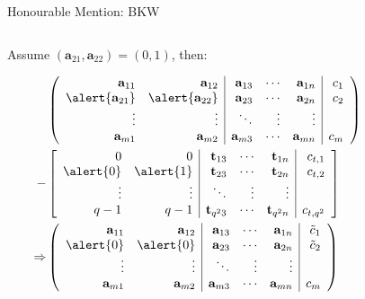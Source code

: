 \documentclass[presentation,smaller]{beamer}
\renewcommand{\vec}[1]{\mathbf{#1}\xspace}
\begin{document}
\begin{frame}[label={sec:org07fde69}]{Honourable Mention: BKW}
\begin{columns}
\begin{column}{0.6\columnwidth}
Assume \((\vec{a}_{21},\vec{a}_{22}) = (0, 1)\), then:

\footnotesize
\begin{align*}
  & \left(
    \begin{array}{rr|rrr|r}
      \phantom{xn}\vec{a}_{11}         & \phantom{xn}\vec{a}_{12}         & \vec{a}_{13} & \cdots & \vec{a}_{1n} & c_1\\
      \alert{\vec{a}_{21}} & \alert{\vec{a}_{22}} & \vec{a}_{23} & \cdots & \vec{a}_{2n} & c_2\\
      \vdots               & \vdots               & \ddots       & \vdots & \vdots\\
      \vec{a}_{m1}         & \vec{a}_{m2}         & \vec{a}_{m3} & \cdots & \vec{a}_{mn} & c_{m}
    \end{array}\right)\\
  -& \left[
     \begin{array}{rr|rrr|r}
       0         & 0         & \vec{t}_{13}   & \cdots & \vec{t}_{1n}   & c_{t,1}\\
       \alert{0} & \alert{1} & \vec{t}_{23}   & \cdots & \vec{t}_{2n}   & c_{t,2}\\
       \vdots    & \vdots    & \ddots         & \vdots & \vdots\\
       q-1       & q-1       & \vec{t}_{q^23} & \cdots & \vec{t}_{q^2n} & c_{t,q^2}
     \end{array}\right]\\
  \Rightarrow &
                \left(\begin{array}{rr|rrr|r}
                        \phantom{xn}\vec{a}_{11} & \phantom{xn}\vec{a}_{12} & \vec{a}_{13}      & \cdots & \vec{a}_{1n}      & \tilde{c}_1\\
                        \alert{0}    & \alert{0}    & \vec{a}_{23} & \cdots & \vec{a}_{2n} & \tilde{c}_2\\
                        \vdots       & \vdots       & \ddots            & \vdots & \vdots\\
                        \vec{a}_{m1} & \vec{a}_{m2} & \vec{a}_{m3}      & \cdots & \vec{a}_{mn}      & c_{m}
                      \end{array}\right)
\end{align*}
\end{column}

\begin{column}{0.4\columnwidth}
\scriptsize



\end{column}
\end{columns}
\end{frame}
\end{document}
